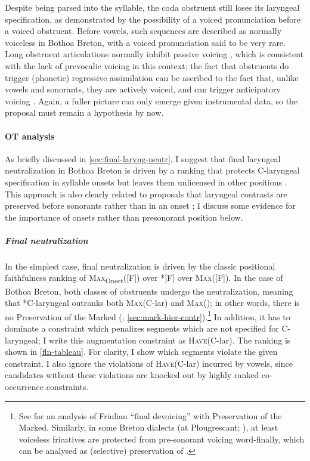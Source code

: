 Despite being parsed into the syllable, the coda obstruent \ipa{[z̥]} still loses its laryngeal specification, as demonstrated by the possibility of a voiced pronunciation before a voiced obstruent. Before vowels, such sequences are described as normally voiceless in Bothoa Breton, with a voiced pronunciation said to be very rare. Long obstruent articulations normally inhibit passive voicing \citep{ohala:_turbul}, which is consistent with the lack of prevocalic voicing in this context; the fact that obstruents do trigger (phonetic) regressive assimilation can be ascribed to the fact that, unlike vowels and sonorants, they are actively voiced, and can trigger anticipatory voicing \citep{jansen04:_laryn}. Again, a fuller picture can only emerge given instrumental data, so the proposal must remain a hypothesis by now.

\paragraph{OT analysis}
\label{sec:ot-analysis-6}

As briefly discussed in \cref{sec:final-laryng-neutr}, I suggest that final laryngeal neutralization in Bothoa Breton is driven by a ranking that protects C-laryngeal specification in syllable onsets but leaves them unlicensed in other positions \citep{bethin92:_polis,beckman,lombardi99:_posit_faith_and_voicin_assim}. This approach is also clearly related to proposals that laryngeal contrasts are preserved before sonorants rather than in an onset \citep{lombardi95:_book,lombardi95:_laryn,rubach08:_prevoc,beckman09:_german,jurgec10:_featur_spread}; I discuss some evidence for the importance of onsets rather than presonorant position below.

\subparagraph{Final neutralization}
\label{sec:final-neutralization}

In the simplest case, final neutralization is driven by the classic positional faithfulness ranking of \textsc{Max}\textsubscript{Onset}([F]) over *[F] over \textsc{Max}([F]). In the case of Bothoa Breton, both classes of obstruents undergo the neutralization, meaning that *C-laryngeal outranks both \textsc{Max}(C-lar) and \textsc{Max}(); in other words, there is no Preservation of the Marked (\citealp{delacy2006}; \cref{sec:mark-hier-contr}).\footnote{See \citet{iosaded:_final_italy} for an analysis of Friulian \enquote{final devoicing} with Preservation of the Marked. Similarly, in some Breton dialects (\eg at Plougrescant; \citealt{le78:_le_ploug}), at least voiceless fricatives are protected from pre-sonorant voicing word-finally, which can be analysed as (selective) preservation of .} In addition, it has to dominate a constraint which penalizes segments which are not specified for C-laryngeal; I write this augmentation constraint as \textsc{Have}(C-lar). The ranking is shown in \ref{fln-tableau}. For clarity, I show which segments violate the given constraint. I also ignore the violations of \textsc{Have}(C-lar) incurred by vowels, since candidates without these violations are knocked out by highly ranked co-occurrence constraints.

